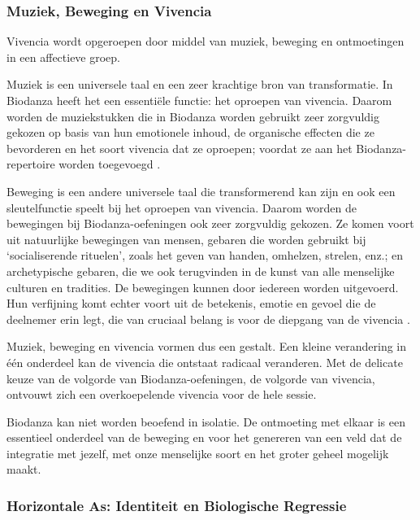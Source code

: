 \documentclass[
  11pt,
]{book}
\begin{document}
\hypertarget{muziek-beweging-en-vivencia}{%
\subsubsection{Muziek, Beweging en Vivencia}\label{muziek-beweging-en-vivencia}}

Vivencia wordt opgeroepen door middel van muziek, beweging en ontmoetingen in een affectieve groep.

Muziek is een universele taal en een zeer krachtige bron van transformatie. In Biodanza heeft het een essentiële functie: het oproepen van vivencia. Daarom worden de muziekstukken die in Biodanza worden gebruikt zeer zorgvuldig gekozen op basis van hun emotionele inhoud, de organische effecten die ze bevorderen en het soort vivencia dat ze oproepen; voordat ze aan het Biodanza-repertoire worden toegevoegd \citep{toro2008}.

Beweging is een andere universele taal die transformerend kan zijn en ook een sleutelfunctie speelt bij het oproepen van vivencia. Daarom worden de bewegingen bij Biodanza-oefeningen ook zeer zorgvuldig gekozen. Ze komen voort uit natuurlijke bewegingen van mensen, gebaren die worden gebruikt bij `socialiserende rituelen', zoals het geven van handen, omhelzen, strelen, enz.; en archetypische gebaren, die we ook terugvinden in de kunst van alle menselijke culturen en tradities. De bewegingen kunnen door iedereen worden uitgevoerd. Hun verfijning komt echter voort uit de betekenis, emotie en gevoel die de deelnemer erin legt, die van cruciaal belang is voor de diepgang van de vivencia \citep{toro2008}.

Muziek, beweging en vivencia vormen dus een gestalt. Een kleine verandering in één onderdeel kan de vivencia die ontstaat radicaal veranderen. Met de delicate keuze van de volgorde van Biodanza-oefeningen, de volgorde van vivencia, ontvouwt zich een overkoepelende vivencia voor de hele sessie.

Biodanza kan niet worden beoefend in isolatie. De ontmoeting met elkaar is een essentieel onderdeel van de beweging en voor het genereren van een veld dat de integratie met jezelf, met onze menselijke soort en het groter geheel mogelijk maakt.

\hypertarget{horizontale-as-identiteit-en-biologische-regressie}{%
\subsubsection{Horizontale As: Identiteit en Biologische Regressie}\label{horizontale-as-identiteit-en-biologische-regressie}}
\end{document}
